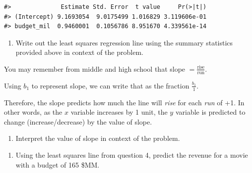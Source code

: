 \documentclass[
]{report}
\newenvironment{Shaded}{\begin{snugshade}}{\end{snugshade}}
\newcommand{\AttributeTok}[1]{\textcolor[rgb]{0.13,0.29,0.53}{#1}}
\newcommand{\CommentTok}[1]{\textcolor[rgb]{0.56,0.35,0.01}{\textit{#1}}}
\newcommand{\FunctionTok}[1]{\textcolor[rgb]{0.13,0.29,0.53}{\textbf{#1}}}
\newcommand{\NormalTok}[1]{#1}
\newcommand{\OtherTok}[1]{\textcolor[rgb]{0.56,0.35,0.01}{#1}}
\newcommand{\SpecialCharTok}[1]{\textcolor[rgb]{0.81,0.36,0.00}{\textbf{#1}}}
\providecommand{\tightlist}{%
  \setlength{\itemsep}{0pt}\setlength{\parskip}{0pt}}
\begin{document}
\begin{Shaded}
\end{Shaded}

\begin{verbatim}
#>              Estimate Std. Error  t value     Pr(>|t|)
#> (Intercept) 9.1693054  9.0175499 1.016829 3.119606e-01
#> budget_mil  0.9460001  0.1056786 8.951670 4.339561e-14
\end{verbatim}

\begin{enumerate}
\def\labelenumi{\arabic{enumi}.}
\setcounter{enumi}{3}
\tightlist
\item
  Write out the least squares regression line using the summary statistics provided above in context of the problem.
  \vspace{0.8in}
\end{enumerate}

You may remember from middle and high school that slope \(=\frac{\mbox{rise}}{\mbox{run}}\).

Using \(b_1\) to represent slope, we can write that as the fraction \(\frac{b_1}{1}\).

Therefore, the slope predicts how much the line will \emph{rise} for each \emph{run} of +1. In other words, as the \(x\) variable increases by 1 unit, the \(y\) variable is predicted to change (increase/decrease) by the value of slope.

\begin{enumerate}
\def\labelenumi{\arabic{enumi}.}
\setcounter{enumi}{4}
\tightlist
\item
  Interpret the value of slope in context of the problem.
\end{enumerate}

\vspace{.8in}

\begin{enumerate}
\def\labelenumi{\arabic{enumi}.}
\setcounter{enumi}{5}
\tightlist
\item
  Using the least squares line from question 4, predict the revenue for a movie with a budget of 165 \$MM.
\end{enumerate}
\end{document}
